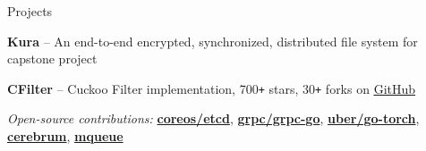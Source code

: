 \documentclass{resume} %
\begin{document}
\begin{rSection}{Projects}
  \begin{rProjectSection}{}{}
    \item \textbf {Kura} -- An end-to-end encrypted, synchronized, distributed file
      system for capstone project
    \item \textbf {CFilter} -- Cuckoo Filter implementation, 700\texttt{+}
      stars, 30\texttt{+} forks on \href{https://git.io/v6GkV}{\underline
      {GitHub}}
  \end{rProjectSection}

  \begin{rBlurbSection}
    \item {\em Open-source contributions:}
      \href{https://github.com/coreos/etcd/pull/8288}{\textbf{coreos/etcd}},
      \href{https://github.com/grpc/grpc-go/pull/1478}{\textbf{grpc/grpc-go}},
      \href{https://github.com/uber/go-torch/pull/62}{\textbf{uber/go-torch}},
      \href{https://rubygems.org/gems/cerebrum}{\textbf{cerebrum}},
      \href{https://rubygems.org/gems/mqueue}{\textbf{mqueue}}
  \end{rBlurbSection}
\end{rSection}
\end{document}
